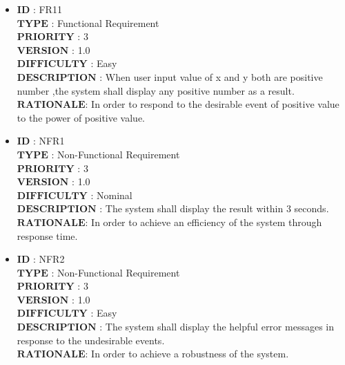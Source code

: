 \documentclass[a4paper, 11pt]{article}
\begin{document}
\begin{itemize}
   \item $\boldsymbol{ID}$\hspace{2.95cm}   : FR11\\
    $\boldsymbol{TYPE}$\hspace{2.2cm}   : Functional Requirement\\
   $\boldsymbol{PRIORITY}$\hspace{1.05cm} : 3\\
   $\boldsymbol{VERSION}$\hspace{1.25cm} : 1.0\\
   $\boldsymbol{DIFFICULTY}$\hspace{0.4cm} : Easy \\
   $\boldsymbol{DESCRIPTION}$     :  When user input value of x and y both are positive number ,the system shall display any positive number as a result.\\
   $\boldsymbol{RATIONALE}$\hspace{0.8cm}: In order to respond to the desirable event of positive value to the power of positive value.\\
   
   \item $\boldsymbol{ID}$\hspace{2.95cm}   : NFR1\\
    $\boldsymbol{TYPE}$\hspace{2.2cm}   : Non-Functional Requirement\\
   $\boldsymbol{PRIORITY}$\hspace{1.05cm} : 3\\
   $\boldsymbol{VERSION}$\hspace{1.25cm} : 1.0\\
   $\boldsymbol{DIFFICULTY}$\hspace{0.4cm} : Nominal \\
   $\boldsymbol{DESCRIPTION}$     :  The system shall display the result within 3 seconds. \\
   $\boldsymbol{RATIONALE}$\hspace{0.8cm}: In order to achieve an efficiency of the system through response time.\\
   
   \item $\boldsymbol{ID}$\hspace{2.95cm}   : NFR2\\
    $\boldsymbol{TYPE}$\hspace{2.2cm}   : Non-Functional Requirement\\
   $\boldsymbol{PRIORITY}$\hspace{1.05cm} : 3\\
   $\boldsymbol{VERSION}$\hspace{1.25cm} : 1.0\\
   $\boldsymbol{DIFFICULTY}$\hspace{0.4cm} : Easy \\
   $\boldsymbol{DESCRIPTION}$     :  The system shall display the helpful error messages in response to the undesirable events. \\
   $\boldsymbol{RATIONALE}$\hspace{0.8cm}: In order to achieve a robustness of the system.\\
   

\end{itemize}
\end{document}
